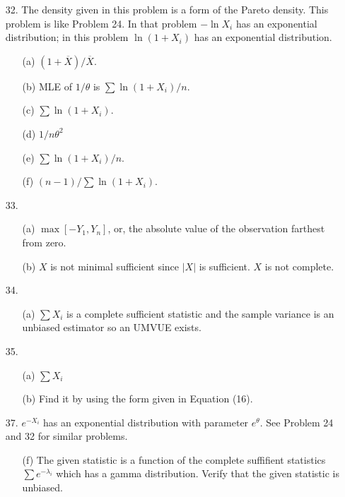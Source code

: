 \begin{enumerate}
	\item[32.] The density given in this problem is a form of the Pareto density.  This problem is like Problem 24.  In that problem $-\ln X_i$ has an exponential distribution; in this problem $\ln(1+X_i)$ has an exponential distribution.
	\begin{enumerate}
		\item[(a)] $(1+\overline{X})/\overline{X}$.
		\item[(b)] MLE of $1/\theta$ is $\sum \ln(1+X_i)/n$.
		\item[(c)] $\sum \ln(1+X_i)$.
		\item[(d)] $1/n\theta^2$
		\item[(e)] $\sum \ln(1+X_i)/n$.
		\item[(f)] $(n-1)/\sum \ln(1+X_i)$.
	\end{enumerate}
	
	\item[33.] \begin{enumerate}
		\item[(a)] $\max[-Y_1,Y_n]$, or, the absolute value of the observation farthest from zero.
		\item[(b)] $X$ is not minimal sufficient since $\vert X\vert$ is sufficient. $X$ is not complete.
	\end{enumerate}  
	  
	\item[34.] \begin{enumerate}
		\item[(a)] $\sum X_i$ is a complete sufficient statistic and the sample variance is an unbiased estimator so an UMVUE exists.
		\end{enumerate}	  
	  
	\item[35.] \begin{enumerate}
		\item[(a)] $\sum X_i$
		\item[(b)] Find it by using the form given in Equation (16).
	\end{enumerate}
	  
	\item[37.] $e^{-X_i}$ has an exponential distribution with parameter $e^\theta$.  See Problem 24 and 32 for similar problems.  
	\begin{enumerate}
		\item[(f)] The given statistic is a function of the complete suffifient statistics $\sum e^{-\lambda_i}$ which has a gamma distribution.  Verify that the given statistic is unbiased. 
	\end{enumerate}
	 

\end{enumerate}
